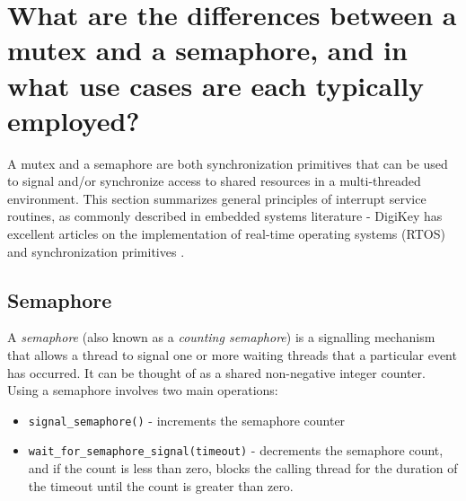 \documentclass[main.tex]{subfiles}
\begin{document}
\section{What are the differences between a mutex and a semaphore, and in what use cases are each typically employed?}

\spoilerline
\noindent A mutex and a semaphore are both synchronization primitives that can be used to signal and/or synchronize access to shared resources in a multi-threaded environment. This section summarizes general principles of interrupt service routines, as commonly described in embedded systems literature - DigiKey has excellent articles on the implementation of real-time operating systems (RTOS) and synchronization primitives \cite{digikey_rtos}.

\subsection{Semaphore}
A \textit{semaphore} (also known as a \textit{counting semaphore}) is a signalling mechanism that allows a thread to signal one or more waiting threads that a particular event has occurred. It can be thought of as a shared non-negative integer counter.
\newline
\newline
Using a semaphore involves two main operations: \begin{itemize}
    \item \texttt{signal\_semaphore()} - increments the semaphore counter
    \item \texttt{wait\_for\_semaphore\_signal(timeout)} - decrements the semaphore count, and if the count is less than zero, blocks the calling thread for the duration of the timeout until the count is greater than zero.
\end{itemize}
\end{document}
